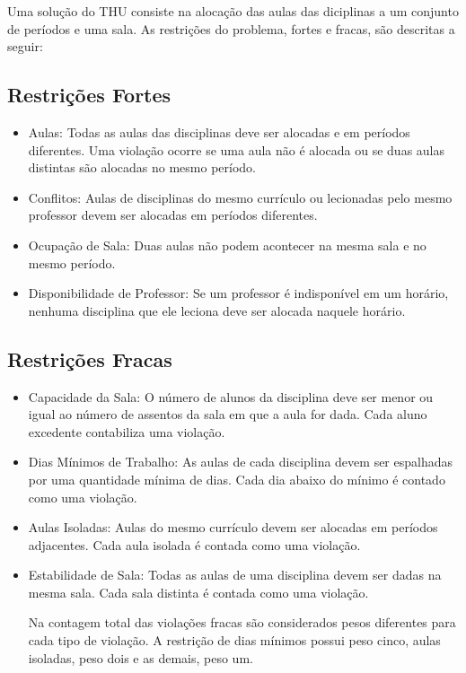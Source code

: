 \documentclass[11pt]{article}
\begin{document}
Uma solução do THU consiste na alocação das aulas das diciplinas a um conjunto de períodos e uma sala. As restrições do problema, fortes e fracas, são descritas a seguir:

\subsection{Restrições Fortes}

\begin{itemize}

\item Aulas: Todas as aulas das disciplinas deve ser alocadas e em períodos diferentes. Uma violação ocorre se uma aula não é alocada ou se duas aulas distintas são alocadas no mesmo período.

\item Conflitos: Aulas de disciplinas do mesmo currículo ou lecionadas pelo mesmo professor devem ser alocadas em períodos diferentes. 

\item Ocupação de Sala: Duas aulas não podem acontecer na mesma sala e no mesmo período.

\item Disponibilidade de Professor: Se um professor é indisponível em um horário, nenhuma disciplina que ele leciona deve ser alocada naquele horário.

\end{itemize}

\subsection{Restrições Fracas}

\begin{itemize}

\item Capacidade da Sala: O número de alunos da disciplina deve ser menor ou igual ao número de assentos da sala em que a aula for dada. Cada aluno excedente contabiliza uma violação.

\item Dias Mínimos de Trabalho: As aulas de cada disciplina devem ser espalhadas por uma quantidade mínima de dias. Cada dia abaixo do mínimo é contado como uma violação.

\item Aulas Isoladas: Aulas do mesmo currículo devem ser alocadas em períodos adjacentes. Cada aula isolada é contada como uma violação.

\item Estabilidade de Sala: Todas as aulas de uma disciplina devem ser dadas na mesma sala. Cada sala distinta é contada como uma violação.

Na contagem total das violações fracas são considerados pesos diferentes para cada tipo de violação. A restrição de dias mínimos possui peso cinco, aulas isoladas, peso dois e as demais, peso um.

\end{itemize}
\end{document}

